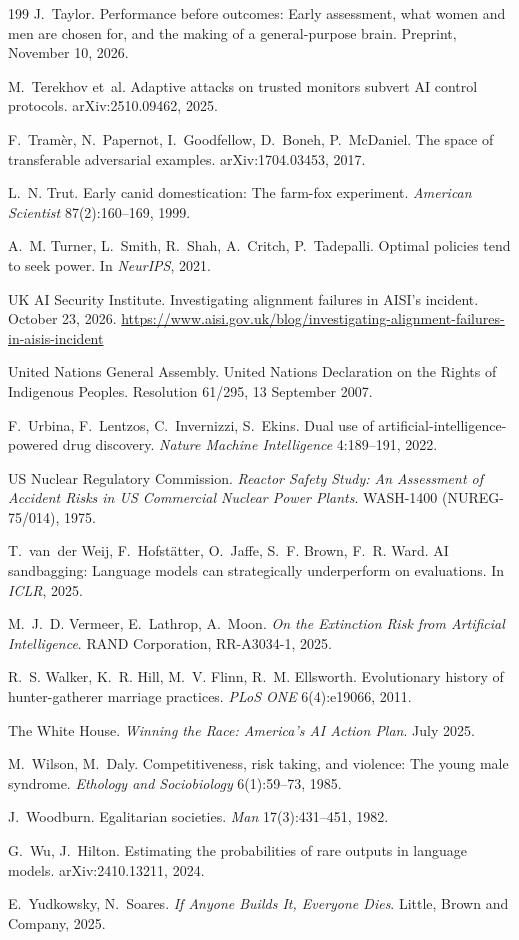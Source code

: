 \documentclass[10pt,twocolumn,letterpaper]{article}
\theoremstyle{definition}
\begin{document}
\begin{thebibliography}{199}
 J.~Taylor. Performance before outcomes: Early assessment, what women and men are chosen for, and the making of a general-purpose brain. Preprint, November 10, 2026.

 M.~Terekhov et~al. Adaptive attacks on trusted monitors subvert AI control protocols. arXiv:2510.09462, 2025.

 F.~Tram\`er, N.~Papernot, I.~Goodfellow, D.~Boneh, P.~McDaniel. The space of transferable adversarial examples. arXiv:1704.03453, 2017.

 L.~N. Trut. Early canid domestication: The farm-fox experiment. \emph{American Scientist} 87(2):160--169, 1999.

 A.~M. Turner, L.~Smith, R.~Shah, A.~Critch, P.~Tadepalli. Optimal policies tend to seek power. In \emph{NeurIPS}, 2021.

 UK AI Security Institute. Investigating alignment failures in AISI's incident. October 23, 2026. \url{https://www.aisi.gov.uk/blog/investigating-alignment-failures-in-aisis-incident}

 United Nations General Assembly. United Nations Declaration on the Rights of Indigenous Peoples. Resolution 61/295, 13 September 2007.

 F.~Urbina, F.~Lentzos, C.~Invernizzi, S.~Ekins. Dual use of artificial-intelligence-powered drug discovery. \emph{Nature Machine Intelligence} 4:189--191, 2022.

 US Nuclear Regulatory Commission. \emph{Reactor Safety Study: An Assessment of Accident Risks in US Commercial Nuclear Power Plants}. WASH-1400 (NUREG-75/014), 1975.

 T.~van~der Weij, F.~Hofst\"atter, O.~Jaffe, S.~F. Brown, F.~R. Ward. AI sandbagging: Language models can strategically underperform on evaluations. In \emph{ICLR}, 2025.

 M.~J.~D. Vermeer, E.~Lathrop, A.~Moon. \emph{On the Extinction Risk from Artificial Intelligence}. RAND Corporation, RR-A3034-1, 2025.

 R.~S. Walker, K.~R. Hill, M.~V. Flinn, R.~M. Ellsworth. Evolutionary history of hunter-gatherer marriage practices. \emph{PLoS ONE} 6(4):e19066, 2011.

 The White House. \emph{Winning the Race: America's AI Action Plan}. July 2025.

 M.~Wilson, M.~Daly. Competitiveness, risk taking, and violence: The young male syndrome. \emph{Ethology and Sociobiology} 6(1):59--73, 1985.

 J.~Woodburn. Egalitarian societies. \emph{Man} 17(3):431--451, 1982.

 G.~Wu, J.~Hilton. Estimating the probabilities of rare outputs in language models. arXiv:2410.13211, 2024.

 E.~Yudkowsky, N.~Soares. \emph{If Anyone Builds It, Everyone Dies}. Little, Brown and Company, 2025.

\end{thebibliography}
\endgroup
\end{document}
